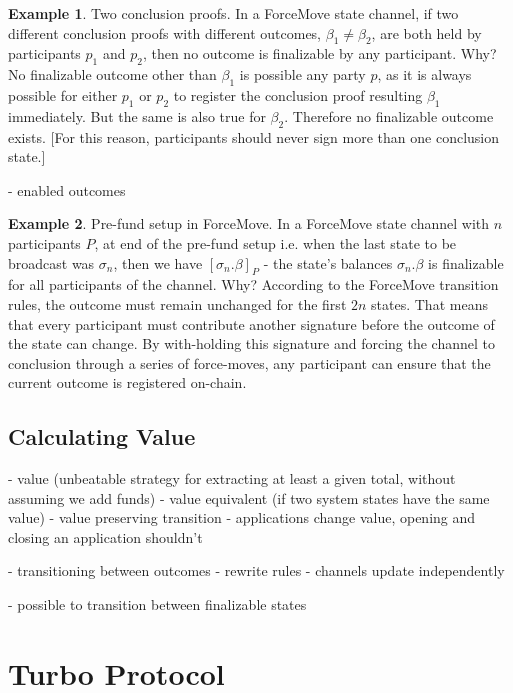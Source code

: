 \documentclass{article}
\theoremstyle{definition}
\newtheorem{example}{Example}[section]
\newcommand{\enf}[1]{[#1]}
\begin{document}
\begin{example}{Two conclusion proofs.}
  In a ForceMove state channel, if two different conclusion proofs with different outcomes,
  $\beta_1 \neq \beta_2$, are both held by participants $p_1$ and $p_2$, then no outcome is finalizable by any participant.
  Why? No finalizable outcome other than $\beta_1$ is possible any party $p$, as it is always
  possible for either $p_1$ or $p_2$ to register the conclusion proof resulting $\beta_1$ immediately.
  But the same is also true for $\beta_2$. Therefore no finalizable outcome exists.
  [For this reason, participants should never sign more than one conclusion state.]
\end{example}

- enabled outcomes

\begin{example}{Pre-fund setup in ForceMove.}
  In a ForceMove state channel with $n$ participants $P$, at end of the pre-fund setup i.e.
  when the last state to be broadcast was $\sigma_n$, then we have $\enf{\sigma_n.\beta}_P$ -
  the state's balances $\sigma_n.\beta$ is finalizable for all participants of the channel.
  Why? According to the ForceMove transition rules, the outcome must remain unchanged for the
  first $2n$ states. That means that every participant must contribute another signature before
  the outcome of the state can change. By with-holding this signature and forcing the channel to
  conclusion through a series of force-moves, any participant can ensure that the current
  outcome is registered on-chain.
\end{example}

\subsection{Calculating Value}

- value (unbeatable strategy for extracting at least a given total, without assuming we add funds)
- value equivalent (if two system states have the same value)
- value preserving transition
- applications change value, opening and closing an application shouldn't

- transitioning between outcomes
- rewrite rules
- channels update independently

- possible to transition between finalizable states

\section{Turbo Protocol}
\end{document}
